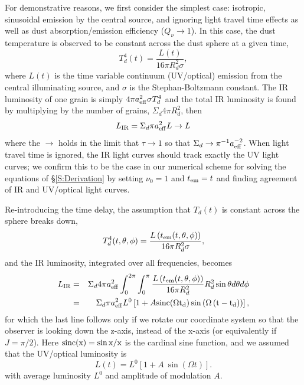For demonstrative reasons, we first consider the simplest case: isotropic,
sinusoidal emission by the central source, and ignoring light travel time
effects as well as dust absorption/emission efficiency ($Q_{\nu} \rightarrow
1$). In this case, the dust temperature is observed to be constant across the
dust sphere at a given time,
\begin{equation}
T^4_d(t) =  \frac{L(t)}{16 \pi R^2_d \sigma},
\end{equation}
where $L(t)$ is the time variable continuum (UV/optical) emission from 
the central illuminating source, and $\sigma$
is the Stephan-Boltzmann constant. The IR luminosity of one grain is simply $4
\pi a^2_{\eff} \sigma T^4_d$ and the total IR luminosity is found by
multiplying by the number of grains, $\Sigma_d 4 \pi R^2_d$, then
\begin{equation}
L_{\rm{IR}} =  \Sigma_d \pi a^2_{\eff} L \rightarrow L
\end{equation}
where the $\rightarrow$ holds in the limit that  $\tau  \rightarrow 1$  so
that $\Sigma_d \rightarrow \pi^{-1} a^{-2}_{\eff}$. When light travel time is
ignored, the IR light curves should track exactly the UV light curves; we
confirm this to be the case in our numerical scheme for solving the equations
of \S \ref{S:Derivation} by setting $\nu_0 = 1$ and $t_{\em} = t$ and finding
agreement of IR and UV/optical light curves.


Re-introducing the time delay, the assumption that $T_d(t)$ is constant across the sphere breaks down,
\begin{equation}
T^4_d(t, \theta, \phi) =  \frac{L\left( t_{\em}(t, \theta, \phi) \right)}{16 \pi R^2_d \sigma},
\end{equation}
and the IR luminosity, integrated over all frequencies, becomes
\begin{eqnarray}
L_{\rm{IR}} 
&=&\Sigma_d 4 \pi a^2_{\eff} \int^{2 \pi}_0{\int^{\pi}_0{  \frac{L\left( t_{\em}(t, \theta, \phi) \right)}{16 \pi R^2_d } R^2_d \sin{\theta} d\theta d\phi }} \nonumber \\
&=&  \Sigma_d \pi  a^2_{\eff} L^0  \left[ 
  1 +  A \rm{sinc}{\left( \Omega t_d \right)}  \sin{ \left( \Omega \left( t - t_d \right) \right)  }
   \right],
   \label{Eq:LIR_sp}
\end{eqnarray}
for which the last line follows only if we rotate our coordinate system so that the observer is looking down the z-axis, instead of the x-axis (or equivalently if $J= \pi/2$). Here $\rm{sinc}(x) = \sin{x}/x$ is the cardinal sine function,
and we assumed that the UV/optical luminosity is
\begin{equation}
L(t) =  L^0  \left[ 
  1 +  A \  \sin{ \left( \Omega t  \right)  }
   \right].
\end{equation}
with average luminosity $L^0$ and amplitude of modulation $A$.

